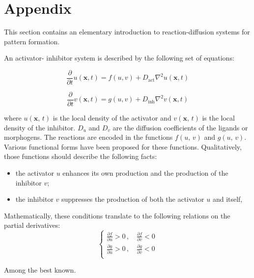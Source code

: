 \chapter{Appendix}

This section contains an elementary introduction to reaction-diffusion systems for pattern formation. 

An activator- inhibitor system is described by the following set of equations:

\begin{equation}
\frac{\partial}{\partial t} u(\mathbf{x}, t) = f(u, v) + D_{\text{act}} \nabla^2 u(\mathbf{x}, t)
\end{equation}

\begin{equation}
\frac{\partial}{\partial t} v(\mathbf{x}, t) = g(u, v) + D_{\text{inh}} \nabla^2 v(\mathbf{x}, t)
\end{equation}

where $u(\mathbf{x},\, t)$ is the local density of the activator and $v(\mathbf{x},\, t)$ is the local density of the inhibitor. $D_u$  and $D_v$ are the diffusion coefficients of the ligands or morphogens. The reactions are encoded in the functions $f(u,\,v)$ and $g(u,\,v)$. Various functional forms have been proposed for these functions. Qualitatively, those functions should describe the following facts:
\begin{itemize}
    \item the activator $u$ enhances its own production and the production of the inhibitor $v$;
    \item the inhibitor $v$ suppresses the production of both the activator $u$ and itself,
\end{itemize}
Mathematically, these conditions translate to the following relations on the partial derivatives:
\begin{equation*}
    \begin{cases}
        \frac{\partial f}{\partial u} > 0 \,,\quad \frac{\partial f}{\partial v} < 0 \\
         \frac{\partial g}{\partial u} > 0 \,,\quad \frac{\partial g}{\partial v} < 0 \\       
    \end{cases}
\end{equation*}



Among the best known.

